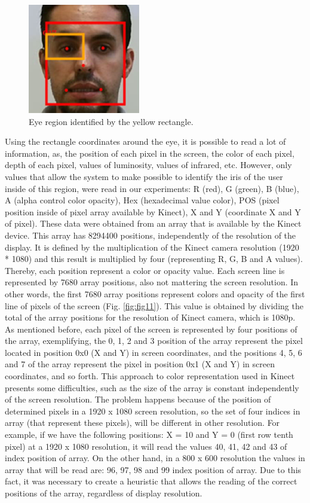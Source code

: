 \documentclass[10pt, conference]{IEEEtran}
\begin{document}
  \begin{figure}[t]
      \centering
      \includegraphics{figures/pic10.png}
      \caption{Eye region identified by the yellow rectangle.}
      \label{fig:fig10}
  \end{figure}

	Using the rectangle coordinates around the eye, it is possible to read a lot of information, as, the position of each pixel in the screen, the color of each pixel, depth of each pixel, values of luminosity, values of infrared, etc. 
	However, only values that allow the system to make possible to identify the iris of the user inside of this region, were read in our experiments: R (red), G (green), B (blue), A (alpha control color opacity), Hex (hexadecimal value color), POS (pixel position inside of pixel array available by Kinect), X and Y (coordinate X and Y of pixel).
	These data were obtained from an array that is available by the Kinect device. This array has 8294400 positions, independently of the resolution of the display. 
	It is defined by the multiplication of the Kinect camera resolution (1920 * 1080) and this result is multiplied by four (representing R, G, B and A values). 
	Thereby, each position represent a color or opacity value. Each screen line is represented by 7680 array positions, also not mattering the screen resolution. In other words, the first 7680 array positions represent colors and opacity of the first line of pixels of the screen (Fig. \ref{fig:fig11}). 
	This value is obtained by dividing the total of the array positions for the resolution of Kinect camera, which is 1080p. 
	As mentioned before, each pixel of the screen is represented by four positions of the array, exemplifying, the 0, 1, 2 and 3 position of the array represent the pixel located in position 0x0 (X and Y) in screen coordinates, and the positions 4, 5, 6 and 7 of the array represent the pixel in position 0x1 (X and Y) in screen coordinates, and so forth.
	This approach to color representation used in Kinect presents some difficulties, such as the size of the array is constant independently of the screen resolution. 
	The problem happens because of the position of determined pixels in a 1920 x 1080 screen resolution, so the set of four indices in array (that represent these pixels), will be different in other resolution. 
	For example, if we have the following positions: X = 10 and Y = 0 (first row tenth pixel) at a 1920 x 1080 resolution, it will read the values 40, 41, 42 and 43 of index position of array. On the other hand, in a 800 x 600 resolution the values in array that will be read are: 96, 97, 98 and 99 index position of array. 
	Due to this fact, it was necessary to create a heuristic that allows the reading of the correct positions of the array, regardless of display resolution.
\end{document}
